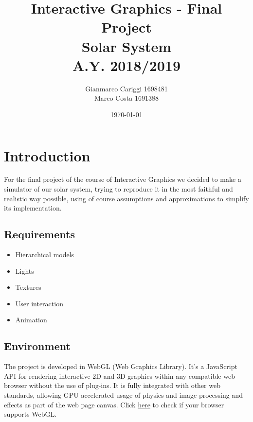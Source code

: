 \documentclass{article}
\begin{document}
\title{\textbf{Interactive Graphics - Final Project}
		\\ \medskip \textbf{Solar System}
		\\ \medskip \large A.Y. 2018/2019 }
\date{\today}
\author{Gianmarco Cariggi 1698481 \\ \medskip Marco Costa 1691388}
\maketitle


\section{Introduction}
For the final project of the course of Interactive Graphics we decided to make a simulator of our solar system, trying to reproduce it in the most faithful and realistic way possible, using of course assumptions and approximations to simplify its implementation.

\subsection{Requirements}
\begin{itemize}
	\item Hierarchical models
	\item Lights
	\item Textures
	\item User interaction
	\item Animation
\end{itemize}

\subsection{Environment}
The project is developed in WebGL (Web Graphics Library). It's a JavaScript API for rendering interactive 2D and 3D graphics within any compatible web browser without the use of plug-ins. It is fully integrated with other web standards, allowing GPU-accelerated usage of physics and image processing and effects as part of the web page canvas.
\newline
Click \href{https://get.webgl.org/}{here} to check if your browser supports WebGL.
\end{document}
